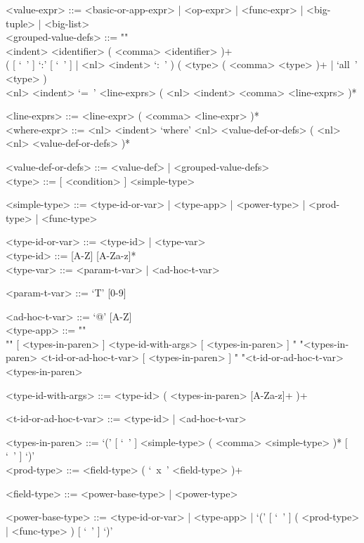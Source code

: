 \documentclass{article}
\begin{document}
\begin{grammar}
<value-expr> ::=
<basic-or-app-expr> | <op-expr> | <func-expr> | <big-tuple> | <big-list>
\\

<grouped-value-defs> ::= ""\\
<indent> <identifier> ( <comma> <identifier> )+ \\
( [ `\ ' ] `:' [ `\ ' ] | <nl> <indent> `:\ ' )
( <type> ( <comma> <type> )+ | `all\ ' <type> ) \\
<nl> <indent> `=\ ' <line-exprs> ( <nl> <indent> <comma> <line-exprs> )*

<line-exprs> ::= <line-expr> ( <comma> <line-expr> )*
\\

<where-expr> ::=
<nl> <indent> `where'
<nl> <value-def-or-defs> ( <nl> <nl> <value-def-or-defs> )*

<value-def-or-defs> ::= <value-def> | <grouped-value-defs> 
\\

<type> ::= [ <condition> ]  <simple-type> 

<simple-type> ::=
<type-id-or-var> | <type-app> | <power-type> | <prod-type> | <func-type>

<type-id-or-var> ::= <type-id> | <type-var>
\\

<type-id> ::= [A-Z] [A-Za-z]*
\\

<type-var> ::= <param-t-var> | <ad-hoc-t-var> 

<param-t-var> ::= `T' [0-9] 

<ad-hoc-t-var> ::= `@' [A-Z] 
\\

<type-app> ::= ""\\""
[ <types-in-paren> ] <type-id-with-args> [ <types-in-paren> ]
\alt " "<types-in-paren> <t-id-or-ad-hoc-t-var> [ <types-in-paren> ]
\alt " "<t-id-or-ad-hoc-t-var> <types-in-paren>

<type-id-with-args> ::= <type-id> ( <types-in-paren> [A-Za-z]+ )+

<t-id-or-ad-hoc-t-var> ::= <type-id> | <ad-hoc-t-var>

<types-in-paren> ::=
`(' [ `\ ' ] <simple-type> ( <comma> <simple-type> )* [ `\ ' ] `)'
\\

<prod-type> ::= <field-type> ( `\ x\ ' <field-type> )+

<field-type> ::= <power-base-type> | <power-type>

<power-base-type> ::=
<type-id-or-var> | <type-app> |
`(' [ `\ ' ] ( <prod-type> | <func-type> ) [ `\ ' ] `)'


\end{grammar}
\end{document}
